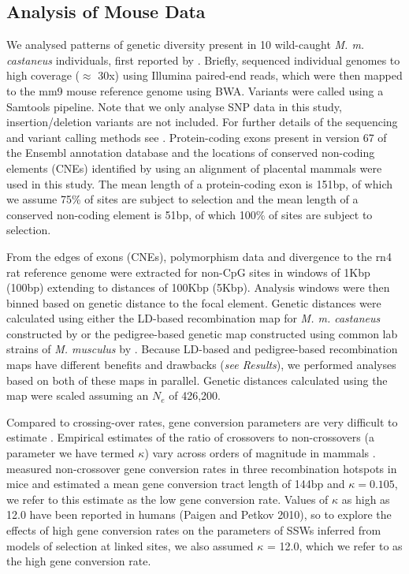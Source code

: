 \documentclass[11pt]{article}
\begin{document}
	\subsection*{Analysis of Mouse Data}

	We analysed patterns of genetic diversity present in 10 wild-caught \textit{M. m. castaneus} individuals, first reported by \cite{RN122}. Briefly, \cite{RN122} sequenced individual genomes to high coverage ($\approx$ 30x) using Illumina paired-end reads, which were then mapped to the mm9 mouse reference genome using BWA. Variants were called using a Samtools pipeline. Note that we only analyse SNP data in this study, insertion/deletion variants are not included. For further details of the sequencing and variant calling methods see \cite{RN122}. Protein-coding exons present in version 67 of the Ensembl annotation database and the locations of conserved non-coding elements (CNEs) identified by \cite{RN122} using an alignment of placental mammals were used in this study. The mean length of a protein-coding exon is 151bp, of which we assume 75\% of sites are subject to selection and the mean length of a conserved non-coding element is 51bp, of which 100\% of sites are subject to selection.

	From the edges of exons (CNEs), polymorphism data and divergence to the rn4 rat reference genome were extracted for non-CpG sites in windows of 1Kbp (100bp) extending to distances of 100Kbp (5Kbp). Analysis windows were then binned based on genetic distance to the focal element. Genetic distances were calculated using either the LD-based recombination map for \textit{M. m. castaneus} constructed by \cite{RN340} or the pedigree-based genetic map constructed using common lab strains of \textit{M. musculus} by \cite{RN232}. Because LD-based and pedigree-based recombination maps have different benefits and drawbacks (\textit{see Results}), we performed analyses based on both of these maps in parallel. Genetic distances calculated using the \cite{RN232} map were scaled assuming an $N_e$ of 426,200.

	Compared to crossing-over rates, gene conversion parameters are very difficult to estimate \citep{RN247}. Empirical estimates of the ratio of crossovers to non-crossovers (a parameter we have termed $\kappa$) vary across orders of magnitude in mammals \citep{RN247}. \cite{RN263} measured non-crossover gene conversion rates in three recombination hotspots in mice and estimated a mean gene conversion tract length of 144bp and $\kappa = 0.105$, we refer to this estimate as the low gene conversion rate. Values of $\kappa$ as high as 12.0 have been reported in humans (Paigen and Petkov 2010), so to explore the effects of high gene conversion rates on the parameters of SSWs inferred from models of selection at linked sites, we also assumed $\kappa$ = 12.0, which we refer to as the high gene conversion rate. 
\end{document}
